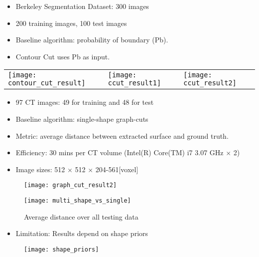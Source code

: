 \documentclass[11pt, a4paper, landscape]{article}
\begin{document}
\NewPage{}
\vfill
\begin{itemize}
\item Berkeley Segmentation Dataset: 300 images
\item 200 training images, 100 test images
\item Baseline algorithm: probability of boundary (Pb).
\item Contour Cut uses Pb as input.
\end{itemize}
\begin{table}
  \centering
  \begin{tabular}{@{} M{.4\linewidth} M{.3\linewidth} M{.3\linewidth} @{}}
      \texttt{[image: contour\_cut\_result]}%
      &
      \texttt{[image: ccut\_result1]}%
      &
      \texttt{[image: ccut\_result2]}%
  \end{tabular}
\end{table}
\vfill


\NewPage{}
\vfill
\begin{itemize}
\item 97 CT images: 49 for training and 48 for test
\item Baseline algorithm: single-shape graph-cuts
\item Metric: average distance between extracted surface and ground truth.
\item Efficiency: 30 mins per CT volume (Intel(R) Core(TM) i7 3.07 GHz $\times$ 2)
\item Image sizes: 512 $\times$ 512 $\times$ 204-561[voxel]
\end{itemize}
\begin{figure}
	\centering
	\texttt{[image: graph\_cut\_result2]}
\end{figure}
\vfill


\NewPage{}
\vfill
\begin{figure}
	\centering
	\texttt{[image: multi\_shape\_vs\_single]}
	\caption{Average distance over all testing data}
\end{figure}
\begin{itemize}
\item Limitation: Results depend on shape priors
\end{itemize}
\begin{figure}
	\centering
	\texttt{[image: shape\_priors]}
\end{figure}
\vfill
\end{document}
